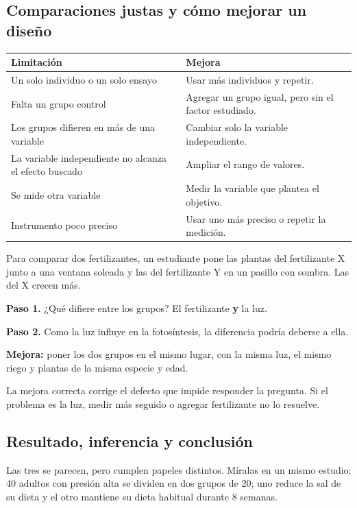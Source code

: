 \subsection{Comparaciones justas y cómo mejorar un diseño}
\begin{center}\small
\begin{tabularx}{\linewidth}{@{}>{\raggedright\arraybackslash\hsize=1.00\hsize}X>{\raggedright\arraybackslash\hsize=1.00\hsize}X@{}}
\toprule
\textbf{Limitación} & \textbf{Mejora} \\
\midrule
Un solo individuo o un solo ensayo & Usar más individuos y repetir. \\
Falta un grupo control & Agregar un grupo igual, pero sin el factor estudiado. \\
Los grupos difieren en más de una variable & Cambiar solo la variable independiente. \\
La variable independiente no alcanza el efecto buscado & Ampliar el rango de valores. \\
Se mide otra variable & Medir la variable que plantea el objetivo. \\
Instrumento poco preciso & Usar uno más preciso o repetir la medición. \\
\bottomrule
\end{tabularx}
\end{center}
  
\begin{ejemplo} Para comparar dos fertilizantes, un estudiante pone las plantas del fertilizante X junto a una ventana soleada y las del fertilizante Y en un pasillo con sombra. Las del X crecen más.\par \textbf{Paso 1.} ¿Qué difiere entre los grupos? El fertilizante \textbf{y} la luz.\par \textbf{Paso 2.} Como la luz influye en la fotosíntesis, la diferencia podría deberse a ella.\par \textbf{Mejora:} poner los dos grupos en el mismo lugar, con la misma luz, el mismo riego y plantas de la misma especie y edad.\end{ejemplo}
 
\begin{clave}[{Recuerda}] La mejora correcta corrige el defecto que impide responder la pregunta. Si el problema es la luz, medir más seguido o agregar fertilizante no lo resuelve.\end{clave}
\subsection{Resultado, inferencia y conclusión}
Las tres se parecen, pero cumplen papeles distintos. Míralas en un mismo estudio: 40 adultos con presión alta se dividen en dos grupos de 20; uno reduce la sal de su dieta y el otro mantiene su dieta habitual durante 8 semanas.

